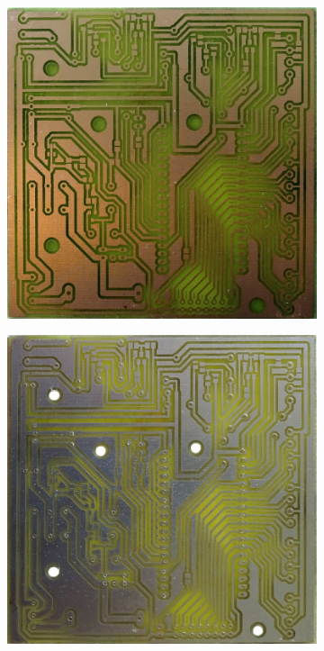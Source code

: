 \begin{figure}[H]
	\begin{subfigure}[c]{0.5\linewidth}	
		\includegraphics[width=\linewidth]{../../pictures/sensorstation/small/DSC00240.JPG}	
	\end{subfigure}
	\begin{subfigure}[c]{0.5\linewidth}	
		\includegraphics[width=\linewidth]{../../pictures/sensorstation/small/DSC00249.JPG}	

\end{subfigure}
\end{figure}
